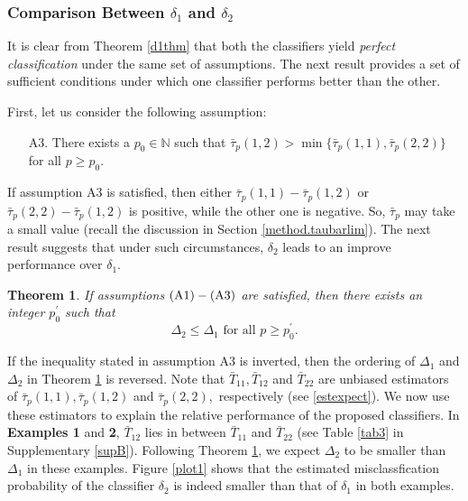 \documentclass[twoside]{article}
\newcommand{\0}{\mathbf{0}}
\newcommand{\1}{\mathbf{1}}
\numberwithin{equation}{section}
\newtheorem{thm}{Theorem}[section]
\begin{document}
\subsubsection{Comparison Between $\delta_1$ and $\delta_2$}\label{d1vsd2}
It is clear from Theorem \ref{d1thm} that both the classifiers yield {\it perfect classification} under the same set of assumptions. The next result provides a set of sufficient conditions under which one classifier performs better than the other.

First, let us consider the following assumption:
\begin{enumerate}
 \item[A3.] There exists a $p_0\in\mathbb{N}$ such that $\bar{\tau}_p(1,2)>\min\{\bar{\tau}_p(1,1),\bar{\tau}_p(2,2)\}$ for all $p\ge p_0.$
\end{enumerate}
If assumption A3 is satisfied, then either $\bar{\tau}_p(1,1)-\bar{\tau}_p(1,2)$ or $\bar{\tau}_p(2,2)-\bar{\tau}_p(1,2)$ is positive, while the other one is negative.
So, $\bar{\tau}_p$ may take a small value (recall the discussion in Section \ref{method.taubarlim}). The next result suggests that under such circumstances, $\delta_2$ leads to an improve performance over $\delta_1.$
\begin{thm}\label{cmpr_d1_d2}
If assumptions ${\rm (A1)}-{\rm (A3)}$ are satisfied, then there exists an integer $p^\prime_0$ such that
$$\Delta_{2} \leq \Delta_{1} \text{ for all } p\geq p^\prime_0.$$
\end{thm}
If the inequality stated in assumption A3 is inverted, then the ordering of $\Delta_1$ and $\Delta_2$ in Theorem \ref{cmpr_d1_d2} is reversed. Note that $\bar{T}_{11} ,\bar{T}_{12}$ and $\bar{T}_{22}$ are unbiased estimators of $\bar{\tau}_p(1,1) ,\bar{\tau}_p(1,2)$ and $\bar{\tau}_p(2,2),$ respectively (see \eqref{estexpect}). We now use these estimators to explain the relative performance of the proposed classifiers. In {\bf Examples 1} and {\bf 2}, $\bar{T}_{12}$ lies in  between $\bar{T}_{11}$ and $\bar{T}_{22}$ (see Table \ref{tab3} in Supplementary \ref{supB}). Following Theorem \ref{cmpr_d1_d2}, we expect $\Delta_2$ to be smaller than $\Delta_1$ in these examples. Figure \ref{plot1} shows that the estimated misclassfication probability of the classifier $\delta_2$ is indeed smaller than that of $\delta_1$ in both examples.
\end{document}

